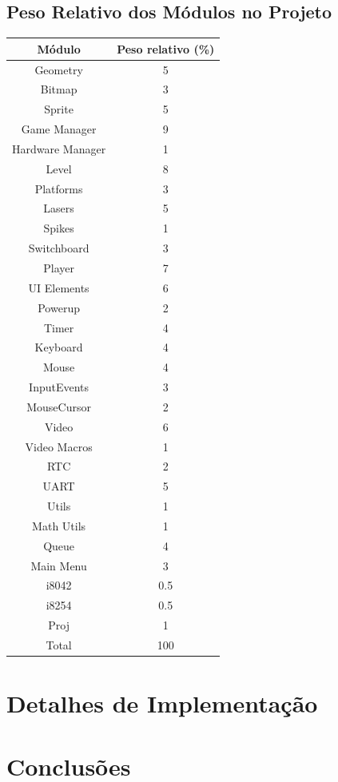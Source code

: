 \documentclass{report}
\begin{document}
\section{Peso Relativo dos Módulos no Projeto}

\begin{center}
	\begin{tabular}{|c|c|} 
		\hline
			Módulo & Peso relativo (\%) \\
		\hline
		\hline
			Geometry & 5 \\
			Bitmap & 3 \\
			Sprite & 5 \\
			Game Manager & 9 \\
			Hardware Manager & 1 \\
			Level & 8 \\
			Platforms & 3 \\
			Lasers & 5 \\
			Spikes & 1 \\
			Switchboard & 3 \\ 
			Player & 7 \\
			UI Elements & 6 \\
			Powerup & 2 \\
			Timer & 4 \\
			Keyboard & 4 \\
			Mouse & 4 \\
			InputEvents & 3 \\
			MouseCursor & 2 \\
			Video & 6 \\
			Video Macros & 1 \\
			RTC & 2 \\
			UART & 5 \\
			Utils & 1 \\
			Math Utils & 1 \\
			Queue & 4 \\
			Main Menu & 3 \\
			i8042 & 0.5 \\
			i8254 & 0.5 \\
			Proj & 1 \\
		\hline
		\hline
			Total & 100 \\
		\hline
	\end{tabular}
\end{center}

\chapter{Detalhes de Implementação}


\chapter{Conclusões}

\paragraph{}
\end{document}
